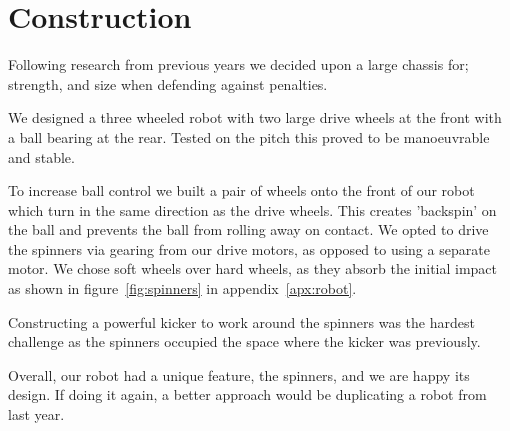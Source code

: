 \section{Construction}

Following research from previous years we decided upon a large chassis for;
strength, and size when defending against penalties. 

We designed a three wheeled robot with two large drive wheels at the front with
a ball bearing at the rear. Tested on the pitch this proved to be manoeuvrable
and stable. 

To increase ball control we built a pair of  wheels onto the front of
our robot which turn in the same direction as the drive wheels. This creates
'backspin' on the ball and prevents the ball from rolling away on contact.  We
opted to drive the spinners via gearing from our drive motors, as opposed to
using a separate motor.  We chose soft wheels over hard wheels, as they
absorb the initial impact as shown in figure~\ref{fig:spinners} in
appendix~\ref{apx:robot}.

Constructing a powerful kicker to work around the spinners was the
hardest challenge as the spinners occupied the space where the kicker was
previously.

Overall, our robot had a unique feature,
the spinners, and we are happy its design. If doing it again, a better
approach would be duplicating a robot from last year.
